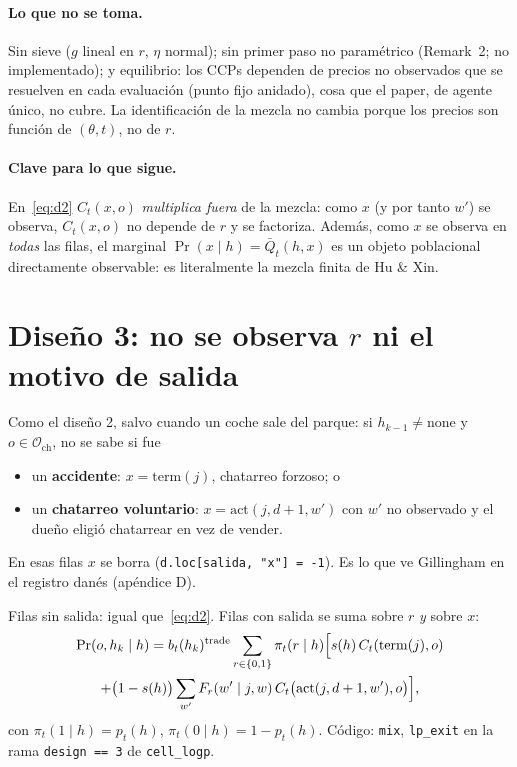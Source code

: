 \documentclass[11pt]{article}
\newcommand{\code}[1]{\texttt{\small #1}}
\newcommand{\act}{\mathrm{act}}
\newcommand{\term}{\mathrm{term}}
\newcommand{\none}{\mathrm{none}}
\newcommand{\buy}{b}
\newcommand{\1}{\mathbf{1}}
\newcommand{\Osc}{\mathcal{O}_{\mathrm{ch}}}
\newcommand{\Qbar}{\bar Q}
\begin{document}
\paragraph{Lo que no se toma.} Sin sieve ($g$ lineal en $r$, $\eta$ normal); sin primer
paso no paramétrico (Remark~2; no implementado); y equilibrio: los CCPs dependen de precios
no observados que se resuelven en cada evaluación (punto fijo anidado), cosa que el paper,
de agente único, no cubre. La identificación de la mezcla no cambia porque los precios son
función de $(\theta,t)$, no de $r$.

\paragraph{Clave para lo que sigue.} En~\eqref{eq:d2} $C_t(x,o)$ \emph{multiplica fuera} de
la mezcla: como $x$ (y por tanto $w'$) se observa, $C_t(x,o)$ no depende de $r$ y se
factoriza. Además, como $x$ se observa en \emph{todas} las filas, el marginal
$\Pr(x\mid h)=\Qbar_t(h,x)$ es un objeto poblacional directamente observable: es literalmente
la mezcla finita de Hu \& Xin.

\section{Diseño 3: no se observa $r$ ni el motivo de salida}

Como el diseño 2, salvo cuando un coche sale del parque: si $h_{k-1}\ne\none$ y
$o\in\Osc$, no se sabe si fue
\begin{itemize}
  \item un \textbf{accidente}: $x=\term(j)$, chatarreo forzoso; o
  \item un \textbf{chatarreo voluntario}: $x=\act(j,d+1,w')$ con $w'$ no observado y el dueño
  eligió chatarrear en vez de vender.
\end{itemize}
En esas filas $x$ se borra (\code{d.loc[salida, "x"] = -1}). Es lo que ve Gillingham en el
registro danés (apéndice D).

Filas sin salida: igual que~\eqref{eq:d2}. Filas con salida se suma sobre $r$ \emph{y} sobre
$x$:
\begin{multline}\label{eq:d3}
  \Pr(o,h_k\mid h)=\buy_t(h_k)^{\text{trade}}\sum_{r\in\{0,1\}}\pi_t(r\mid h)
  \Bigl[s(h)\,C_t(\term(j),o)\Bigr.\\
  \Bigl.+\bigl(1-s(h)\bigr)\sum_{w'}F_r(w'\mid j,w)\,
  C_t\bigl(\act(j,d+1,w'),o\bigr)\Bigr],
\end{multline}
con $\pi_t(1\mid h)=p_t(h)$, $\pi_t(0\mid h)=1-p_t(h)$. Código: \code{mix}, \code{lp\_exit} en
la rama \code{design == 3} de \code{cell\_logp}.
\end{document}
